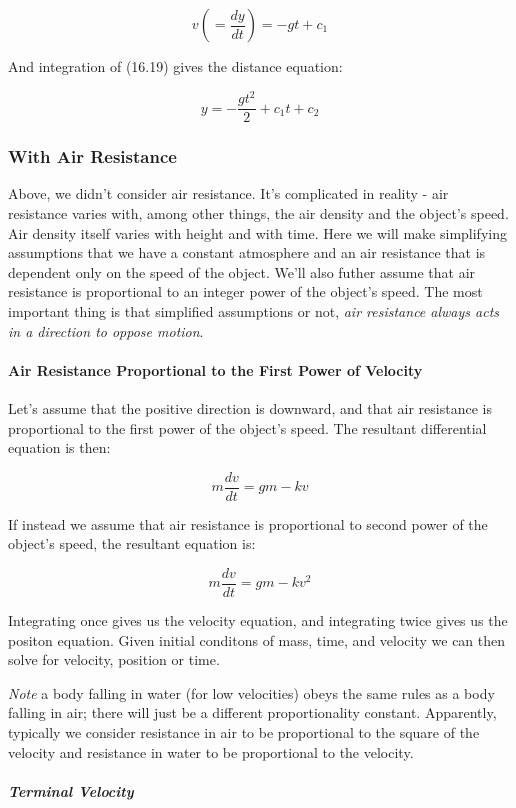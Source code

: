 \documentclass{article}
\begin{document}
\[ \tag{16.19} v(=\frac{dy}{dt}) = -gt + c_1 \]

And integration of (16.19) gives the distance equation:

\[ \tag{16.2} y = - \frac{gt^2}{2} + c_1t + c_2 \]

\subsubsection{With Air Resistance}

Above, we didn't consider air resistance. It's complicated in reality - air resistance varies with, among other things, the air density and the object's speed. Air density itself varies with height and with time. Here we will make simplifying assumptions that we have a constant atmosphere and an air resistance that is dependent only on the speed of the object. We'll also futher assume that air resistance is proportional to an \@{integer} power of the object's speed. The most important thing is that simplified assumptions or not, \emph{air resistance always acts in a direction to oppose motion}. 

\paragraph{Air Resistance Proportional to the First Power of Velocity}

Let's assume that the positive direction is downward, and that air resistance is proportional to the first power of the object's speed. The resultant differential equation is then:

\[ m \frac{dv}{dt} = gm - kv \]

If instead we assume that air resistance is proportional to second power of the object's speed, the resultant equation is:

\[ m \frac{dv}{dt} = gm - kv^2 \]

Integrating once gives us the velocity equation, and integrating twice gives us the positon equation. Given initial conditons of mass, time, and velocity we can then solve for velocity, position or time.

\emph{Note} a body falling in water (for low velocities) obeys the same rules as a body falling in air; there will just be a different proportionality constant. Apparently, typically we consider resistance in air to be proportional to the square of the velocity and resistance in water to be proportional to the velocity.

\subparagraph{Terminal Velocity}
\end{document}
